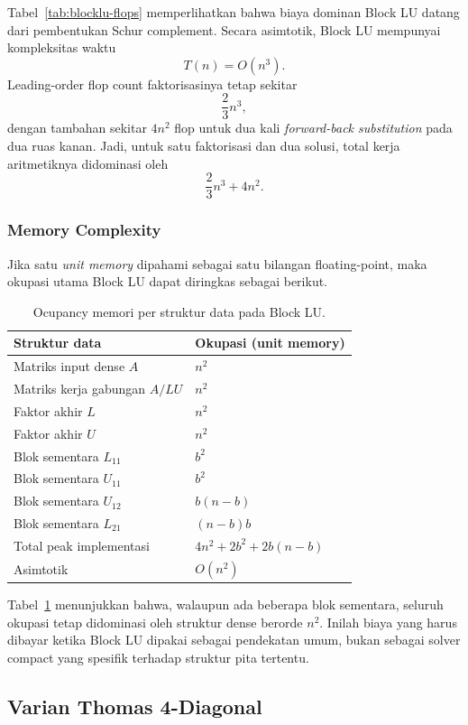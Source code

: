 \documentclass[12pt,a4paper]{article}
\begin{document}
Tabel~\ref{tab:blocklu-flops} memperlihatkan bahwa biaya dominan Block LU datang dari pembentukan Schur complement. Secara asimtotik, Block LU mempunyai kompleksitas waktu
\[
T(n)=O(n^3).
\]
Leading-order flop count faktorisasinya tetap sekitar
\[
\frac{2}{3}n^3,
\]
dengan tambahan sekitar $4n^2$ flop untuk dua kali \emph{forward-back substitution} pada dua ruas kanan. Jadi, untuk satu faktorisasi dan dua solusi, total kerja aritmetiknya didominasi oleh
\[
\frac{2}{3}n^3 + 4n^2.
\]

\subsubsection*{Memory Complexity}
Jika satu \emph{unit memory} dipahami sebagai satu bilangan floating-point, maka okupasi utama Block LU dapat diringkas sebagai berikut.

\begin{table}[h]
\centering
\caption{Ocupancy memori per struktur data pada Block LU.}
\label{tab:blocklu-memory}
\begin{tabular}{ll}
\toprule
Struktur data & Okupasi (unit memory) \\
\midrule
Matriks input dense $A$ & $n^2$ \\
Matriks kerja gabungan $A/LU$ & $n^2$ \\
Faktor akhir $L$ & $n^2$ \\
Faktor akhir $U$ & $n^2$ \\
Blok sementara $L_{11}$ & $b^2$ \\
Blok sementara $U_{11}$ & $b^2$ \\
Blok sementara $U_{12}$ & $b(n-b)$ \\
Blok sementara $L_{21}$ & $(n-b)b$ \\
\midrule
Total peak implementasi & $4n^2 + 2b^2 + 2b(n-b)$ \\
Asimtotik & $O(n^2)$ \\
\bottomrule
\end{tabular}
\end{table}

Tabel~\ref{tab:blocklu-memory} menunjukkan bahwa, walaupun ada beberapa blok sementara, seluruh okupasi tetap didominasi oleh struktur dense berorde $n^2$. Inilah biaya yang harus dibayar ketika Block LU dipakai sebagai pendekatan umum, bukan sebagai solver compact yang spesifik terhadap struktur pita tertentu.

\subsection{Varian Thomas 4-Diagonal}
\end{document}
